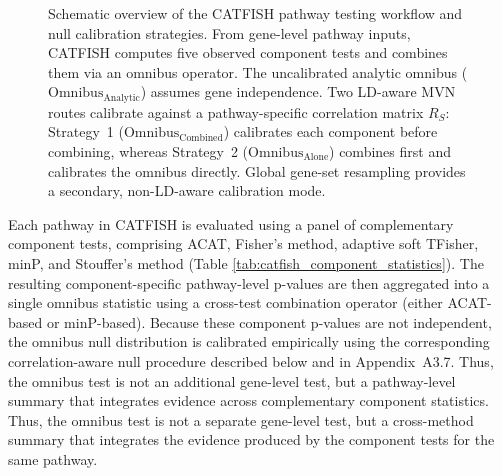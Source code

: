 \documentclass[unnumsec,webpdf,contemporary,large]{oup-authoring-template}%
\theoremstyle{thmstyleone}%
\theoremstyle{thmstyletwo}%
\theoremstyle{thmstylethree}%
\begin{document}
\begin{figure}[!t]
{%
}
\caption{Schematic overview of the CATFISH pathway testing workflow and null
calibration strategies. From gene-level pathway inputs, CATFISH computes five
observed component tests and combines them via an omnibus operator. The
uncalibrated analytic omnibus ($\mathrm{Omnibus}_{\mathrm{Analytic}}$) assumes
gene independence. Two LD-aware MVN routes calibrate against a pathway-specific
correlation matrix $R_S$: Strategy~1 ($\mathrm{Omnibus}_{\mathrm{Combined}}$)
calibrates each component before combining, whereas Strategy~2
($\mathrm{Omnibus}_{\mathrm{Alone}}$) combines first and calibrates the omnibus
directly. Global gene-set resampling provides a secondary, non-LD-aware
calibration mode.}
\label{fig:catfish_workflow}
\end{figure}

Each pathway in CATFISH is evaluated using a panel of complementary component tests, comprising ACAT, Fisher's method, adaptive soft TFisher, minP, and Stouffer's method (Table \ref{tab:catfish_component_statistics}). The resulting component-specific pathway-level p-values are then aggregated into a single omnibus statistic using a cross-test combination operator (either ACAT-based or minP-based). Because these component p-values are not independent, the omnibus null distribution is calibrated empirically using the corresponding correlation-aware null procedure described below and in Appendix~A3.7. Thus, the omnibus test is not an additional gene-level test, but a pathway-level summary that integrates evidence across complementary component statistics. Thus, the omnibus test is not a separate gene-level test, but a cross-method summary that integrates the evidence produced by the component tests for the same pathway.
\end{document}
